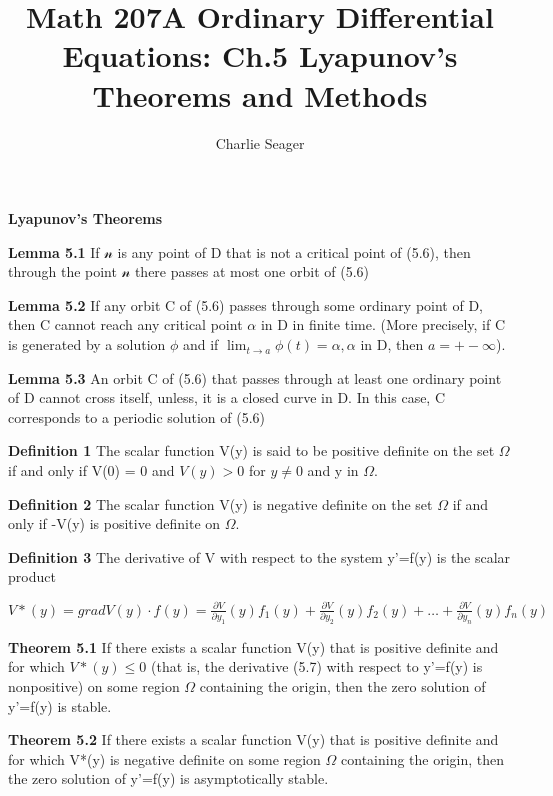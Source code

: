 \documentclass{article}
\begin{document}
\title {Math 207A Ordinary Differential Equations: Ch.5 Lyapunov's Theorems and Methods}

\author{Charlie Seager}

\maketitle

\textbf{Lyapunov's Theorems}

\textbf {Lemma 5.1} If $\mathscr{n}$ is any point of D that is not a critical point of (5.6), then through the point $\mathcal{n}$ there passes at most one orbit of (5.6)

\textbf {Lemma 5.2} If any orbit C of (5.6) passes through some ordinary point of D, then C cannot reach any critical point $\alpha$ in D in finite time. (More precisely, if C is generated by a solution $\phi$ and if $\lim_{t \to a} \phi(t) = \alpha, \alpha$ in D, then $a = +- \infty$).

\textbf {Lemma 5.3} An orbit C of (5.6) that passes through at least one ordinary point of D cannot cross itself, unless, it is a closed curve in D. In this case, C corresponds to a periodic solution of (5.6)

\textbf {Definition 1} The scalar function V(y) is said to be positive definite on the set $\Omega$ if and only if V(0) = 0 and $V(y) > 0$ for $y \neq 0$ and y in $\Omega$.

\textbf {Definition 2} The scalar function V(y) is negative definite on the set $\Omega$ if and only if -V(y) is positive definite on $\Omega$.

\textbf {Definition 3} The derivative of V with respect to the system y'=f(y) is the scalar product
\begin{center}
$V*(y) = grad V(y) \cdot f(y) = \frac{\partial V}{\partial y_1} (y) f_1 (y) + \frac{\partial V}{\partial y_2} (y) f_2(y) + \dots + \frac{\partial V}{\partial y_n} (y)f_n(y)$
\end{center}

\textbf {Theorem 5.1} If there exists a scalar function V(y) that is positive definite and for which $V*(y) \leq 0$ (that is, the derivative (5.7) with respect to y'=f(y) is nonpositive) on some region $\Omega$ containing the origin, then the zero solution of y'=f(y) is stable.

\textbf {Theorem 5.2} If there exists a scalar function V(y) that is positive definite and for which V*(y) is negative definite on some region $\Omega$ containing the origin, then the zero solution of y'=f(y) is asymptotically stable.
\end{document}
